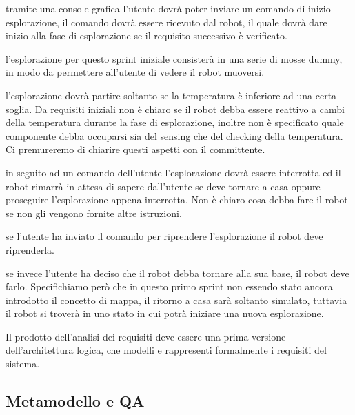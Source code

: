 \begin{description}[itemsep=1em]
  \item[\requirementref{R-startExplore}]
    tramite una console grafica l'utente dovrà poter inviare un comando di inizio esplorazione, il comando dovrà essere ricevuto dal robot, il quale dovrà dare inizio alla fase di esplorazione se il requisito successivo è verificato.
  \item[\requirementref{R-explore}]
    l'esplorazione per questo sprint iniziale consisterà in una serie di mosse dummy, in modo da permettere all'utente di vedere il robot muoversi.
  \item[\requirementref{R-tempOk}]
    l'esplorazione dovrà partire soltanto se la temperatura è inferiore ad una certa soglia. Da requisiti iniziali non è chiaro se il robot debba essere reattivo a cambi della temperatura durante la fase di esplorazione, inoltre non è specificato quale componente debba occuparsi sia del sensing che del checking della temperatura. Ci premureremo di chiarire questi aspetti con il committente.
  \item[\requirementref{R-stopExplore}]
    in seguito ad un comando dell'utente l'esplorazione dovrà essere interrotta ed il robot rimarrà in attesa di sapere dall'utente se deve tornare a casa oppure proseguire l'esplorazione appena interrotta. Non è chiaro cosa debba fare il robot se non gli vengono fornite altre istruzioni.
  \item[\requirementref{R-continueExplore}]
    se l'utente ha inviato il comando per riprendere l'esplorazione il robot deve riprenderla.
  \item[\requirementref{R-backHome}]
    se invece l'utente ha deciso che il robot debba tornare alla sua base, il robot deve farlo. Specifichiamo però che in questo primo sprint non essendo stato ancora introdotto il concetto di mappa, il ritorno a casa sarà soltanto simulato, tuttavia il robot si troverà in uno stato in cui potrà iniziare una nuova esplorazione.
\end{description}


Il prodotto dell'analisi dei requisiti deve essere una prima versione dell'architettura logica, che modelli e rappresenti formalmente i requisiti del sistema.

\subsection{Metamodello e QA}

